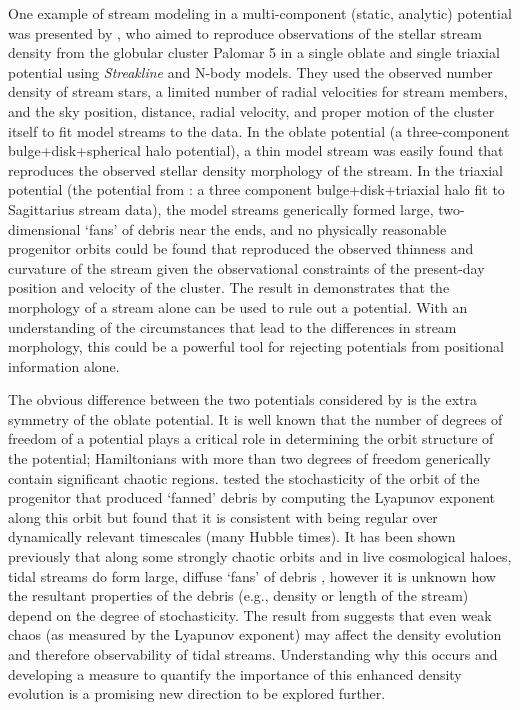 One example of stream modeling in a multi-component (static, analytic) potential
was presented by \citet{pearson15}, who aimed to reproduce observations of the
stellar stream density from the globular cluster Palomar 5 in a single oblate
and single triaxial potential using \emph{Streakline} \citep{kuepper12} and
N-body models. They used the observed number density of stream stars, a limited
number of radial velocities for stream members, and the sky position, distance,
radial velocity, and proper motion of the cluster itself to fit model streams to
the data. In the oblate potential (a three-component bulge+disk+spherical halo
potential), a thin model stream was easily found that reproduces the observed
stellar density morphology of the stream. In the triaxial potential (the
potential from \cite{law10}: a three component bulge+disk+triaxial halo fit to
Sagittarius stream data), the model streams generically formed large,
two-dimensional `fans' of debris near the ends, and no physically reasonable
progenitor orbits could be found that reproduced the observed thinness and
curvature of the stream given the observational constraints of the present-day
position and velocity of the cluster. The result in \citet{pearson15}
demonstrates that the morphology of a stream alone can be used to rule out a
potential. With an understanding of the circumstances that lead to the
differences in stream morphology, this could be a powerful tool for rejecting
potentials from positional information alone.

The obvious difference between the two potentials considered by
\citet{pearson15} is the extra symmetry of the oblate potential. It is well
known that the number of degrees of freedom of a potential plays a critical role
in determining the orbit structure of the potential; Hamiltonians with more than
two degrees of freedom generically contain significant chaotic regions.
\citet{pearson15} tested the stochasticity of the orbit of the progenitor that
produced `fanned' debris by computing the Lyapunov exponent along this orbit but
found that it is consistent with being regular over dynamically relevant
timescales (many Hubble times). It has been shown previously that along some
strongly chaotic orbits and in live cosmological haloes, tidal streams do form
large, diffuse `fans' of debris \citep[e.g.,][]{fardal14, ngan15}, however it is
unknown how the resultant properties of the debris (e.g., density or length of
the stream) depend on the degree of stochasticity. The result from
\citet{pearson15} suggests that even weak chaos (as measured by the Lyapunov
exponent) may affect the density evolution and therefore observability of tidal
streams. Understanding why this occurs and developing a measure to quantify the
importance of this enhanced density evolution is a promising new direction to be
explored further.

